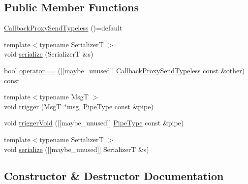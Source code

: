 \subsection*{Public Member Functions}
\begin{DoxyCompactItemize}
\item 
\hyperlink{structvt_1_1pipe_1_1callback_1_1_callback_proxy_send_typeless_a2b6bf89be0a074e8562b66fdb494bff4}{Callback\+Proxy\+Send\+Typeless} ()=default
\item 
{\footnotesize template$<$typename SerializerT $>$ }\\void \hyperlink{structvt_1_1pipe_1_1callback_1_1_callback_proxy_send_typeless_a242959ee9305f935040801ce121b7c1a}{serialize} (SerializerT \&s)
\item 
bool \hyperlink{structvt_1_1pipe_1_1callback_1_1_callback_proxy_send_typeless_a9ae5125e331b72b3bd3d7e416f5a12a4}{operator==} (\mbox{[}\mbox{[}maybe\+\_\+unused\mbox{]}\mbox{]} \hyperlink{structvt_1_1pipe_1_1callback_1_1_callback_proxy_send_typeless}{Callback\+Proxy\+Send\+Typeless} const \&other) const
\item 
{\footnotesize template$<$typename MsgT $>$ }\\void \hyperlink{structvt_1_1pipe_1_1callback_1_1_callback_proxy_send_typeless_ad5d57986704d5a139737e0837200b2b7}{trigger} (MsgT $\ast$msg, \hyperlink{namespacevt_ac9852acda74d1896f48f406cd72c7bd3}{Pipe\+Type} const \&pipe)
\item 
void \hyperlink{structvt_1_1pipe_1_1callback_1_1_callback_proxy_send_typeless_a4d167bcbd52c771b8b48019dd192b0e6}{trigger\+Void} (\mbox{[}\mbox{[}maybe\+\_\+unused\mbox{]}\mbox{]} \hyperlink{namespacevt_ac9852acda74d1896f48f406cd72c7bd3}{Pipe\+Type} const \&pipe)
\item 
{\footnotesize template$<$typename SerializerT $>$ }\\void \hyperlink{structvt_1_1pipe_1_1callback_1_1_callback_proxy_send_typeless_aaf797c2ffe2baa71442fadbcdddb5503}{serialize} (\mbox{[}\mbox{[}maybe\+\_\+unused\mbox{]}\mbox{]} SerializerT \&s)
\end{DoxyCompactItemize}


\subsection{Constructor \& Destructor Documentation}
\mbox{\label{structvt_1_1pipe_1_1callback_1_1_callback_proxy_send_typeless_a2b6bf89be0a074e8562b66fdb494bff4}} 
